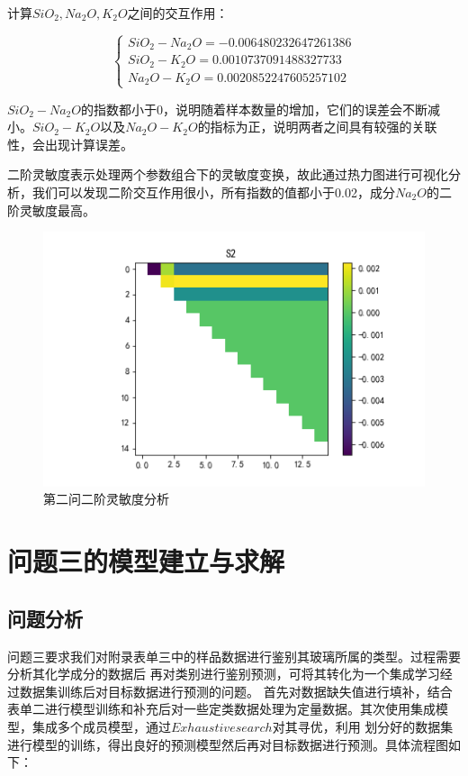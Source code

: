 \documentclass[UTF8]{ctexart}
\begin{document}
计算$SiO_2,Na_2O,K_2O$之间的交互作用：


\[\left\{\begin{array}{llcl}
    SiO_2-Na_2O = -0.006480232647261386      \\
    SiO_2-K_2O =	0.0010737091488327733		\\
    Na_2O-K_2O =0.0020852247605257102
\end{array} \right.\]


$SiO_2-Na_2O$的指数都小于0，说明随着样本数量的增加，它们的误差会不断减小。$SiO_2-K_2O$以及$Na_2O-K_2O$的指标为正，说明两者之间具有较强的关联性，会出现计算误差。

二阶灵敏度表示处理两个参数组合下的灵敏度变换，故此通过热力图进行可视化分析，我们可以发现二阶交互作用很小，所有指数的值都小于0.02，成分$Na_2O$的二阶灵敏度最高。

\begin{figure}[H]\centering
	\includegraphics[width=1\textwidth,height=0.6\textwidth]{img/S2_heatmap.png} %
	\caption{第二问二阶灵敏度分析} %
	\label{fig:figure 6} %
\end{figure}


\section{问题三的模型建立与求解}
\subsection{问题分析}
问题三要求我们对附录表单三中的样品数据进行鉴别其玻璃所属的类型。过程需要分析其化学成分的数据后
再对类别进行鉴别预测，可将其转化为一个集成学习经过数据集训练后对目标数据进行预测的问题。
首先对数据缺失值进行填补，结合表单二进行模型训练和补充后对一些定类数据处理为定量数据。其次使用集成模型，集成多个成员模型，通过$Exhaustive search$对其寻优，利用
划分好的数据集进行模型的训练，得出良好的预测模型然后再对目标数据进行预测。具体流程图如下：
\end{document}
